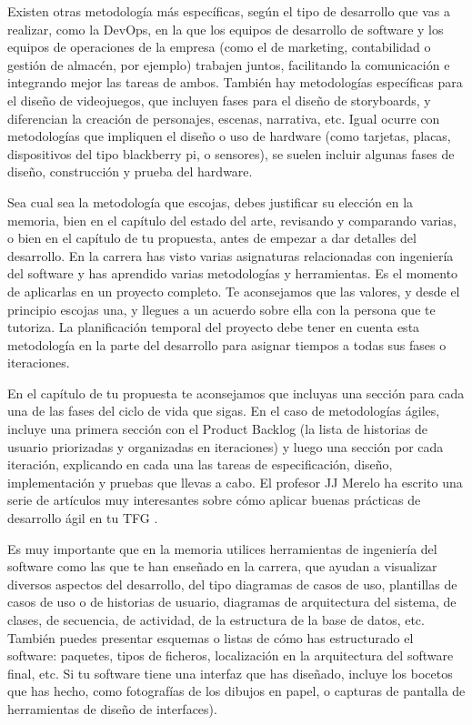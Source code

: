 Existen otras metodología más específicas, según el tipo de desarrollo que vas a realizar, como la DevOps, en la que los  equipos de desarrollo  de software y los equipos de operaciones de la empresa (como el de marketing, contabilidad o gestión de almacén, por ejemplo) trabajen juntos, facilitando la comunicación e integrando mejor las tareas de ambos. También hay metodologías específicas para el diseño de videojuegos, que incluyen fases para el diseño de storyboards, y diferencian la creación de personajes, escenas, narrativa, etc. Igual ocurre con metodologías que impliquen el diseño o uso de hardware (como tarjetas, placas, dispositivos del tipo blackberry pi, o sensores), se suelen incluir algunas fases de diseño, construcción y prueba del hardware. 

Sea cual sea la metodología que escojas, debes justificar su elección en la memoria, bien en el capítulo del estado del arte,  revisando y comparando varias, o bien en el capítulo de tu propuesta, antes de empezar a dar detalles del desarrollo. En la carrera has visto varias asignaturas relacionadas con ingeniería del software y has aprendido varias metodologías y herramientas. Es el momento de aplicarlas en un proyecto completo. Te aconsejamos que las valores, y desde el principio escojas una, y llegues a un acuerdo sobre ella con la persona que te tutoriza. La planificación temporal del proyecto debe tener en cuenta esta metodología en la parte del desarrollo para asignar tiempos a todas sus fases o iteraciones. 

En el capítulo de tu propuesta te aconsejamos que incluyas una sección para cada una de las fases del ciclo de vida que sigas. En el caso de metodologías ágiles, incluye una primera sección con el Product Backlog (la lista de historias de usuario priorizadas y organizadas en iteraciones) y luego una sección por cada iteración, explicando en cada una las tareas de especificación, diseño, implementación y pruebas que llevas a cabo. El profesor JJ Merelo ha escrito una serie de artículos muy interesantes sobre cómo aplicar buenas prácticas de desarrollo ágil en tu TFG \cite{TFGs2024JJ}.

Es muy importante que en la memoria utilices herramientas de ingeniería del software como las que te han enseñado en la carrera, que ayudan a visualizar diversos aspectos del desarrollo, del tipo diagramas de casos de uso, plantillas de casos de uso o de historias de usuario, diagramas de arquitectura del sistema, de clases, de secuencia, de actividad, de la estructura de la base de datos, etc. También puedes presentar esquemas o listas de cómo has estructurado el software: paquetes, tipos de ficheros, localización en la arquitectura del software final, etc. Si tu software tiene una interfaz que has diseñado, incluye los bocetos que has hecho, como fotografías de los dibujos en papel, o capturas de pantalla de herramientas de diseño de interfaces). 

